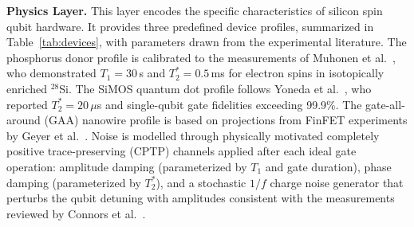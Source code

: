 \documentclass[preprint,12pt, a4paper]{elsarticle}
\begin{document}
\textbf{Physics Layer.} This layer encodes the specific characteristics of silicon spin qubit hardware. It provides three predefined device profiles, summarized in Table~\ref{tab:devices}, with parameters drawn from the experimental literature. The phosphorus donor profile is calibrated to the measurements of Muhonen et al.~\cite{muhonen2014storing}, who demonstrated $T_1 = 30$\,s and $T_2^* = 0.5$\,ms for electron spins in isotopically enriched $^{28}$Si. The SiMOS quantum dot profile follows Yoneda et al.~\cite{yoneda2018quantum}, who reported $T_2^* = 20$\,$\mu$s and single-qubit gate fidelities exceeding 99.9\%. The gate-all-around (GAA) nanowire profile is based on projections from FinFET experiments by Geyer et al.~\cite{geyer2022twoqubit}. Noise is modelled through physically motivated completely positive trace-preserving (CPTP) channels applied after each ideal gate operation: amplitude damping (parameterized by $T_1$ and gate duration), phase damping (parameterized by $T_2^*$), and a stochastic $1/f$ charge noise generator that perturbs the qubit detuning with amplitudes consistent with the measurements reviewed by Connors et al.~\cite{connors2022charge}.
\end{document}
